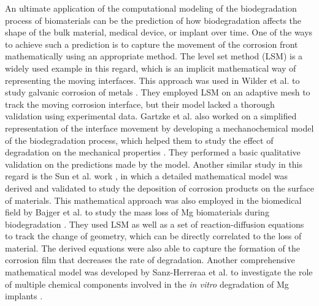 An ultimate application of the computational modeling of the biodegradation process of biomaterials can be the prediction of how biodegradation affects the shape of the bulk material, medical device, or implant over time. One of the ways to achieve such a prediction is to capture  the movement of the corrosion front mathematically using an appropriate method. The level set method ({LSM}) is a widely used example in this regard, which is an implicit mathematical way of representing the moving interfaces. This approach was used in Wilder et al. to study galvanic corrosion of metals \cite{Wilder2014}. They employed {LSM} on an adaptive mesh to track the moving corrosion interface, but  their model lacked a thorough validation using experimental data.
Gartzke et al. also worked on a simplified representation of the interface movement by developing a mechanochemical model of the biodegradation process, which helped them to study the effect of degradation on the mechanical properties \cite{Gartzke2020}. They performed a basic qualitative validation on the predictions made by the model.
Another similar study in this regard is the Sun et al. work \cite{Sun2012}, in which a detailed mathematical model was derived and validated to study the deposition of  corrosion products on the surface of materials.
This mathematical approach was also employed in the biomedical field by Bajger et al. to study the mass loss of Mg biomaterials during biodegradation \cite{Bajger2016}. They used {LSM} as well as a set of reaction-diffusion equations to track the change of geometry, which can be directly correlated to the loss of material. The derived equations were also able to capture the formation of the corrosion film that decreases the rate of degradation.
Another comprehensive mathematical model was developed by Sanz-Herreraa et al. to investigate the role of multiple chemical components involved in the \textit{in vitro} degradation of Mg implants \cite{Sanz-Herrera2018}.
